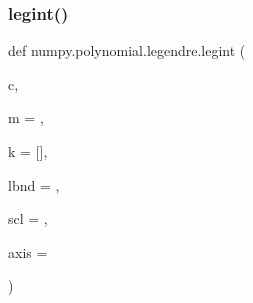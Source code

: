 \subsubsection{\texorpdfstring{legint()}{legint()}}
{\footnotesize\ttfamily def numpy.\+polynomial.\+legendre.\+legint (\begin{DoxyParamCaption}\item[{}]{c,  }\item[{}]{m = {},  }\item[{}]{k = {\ttfamily \mbox{[}\mbox{]}},  }\item[{}]{lbnd = {},  }\item[{}]{scl = {},  }\item[{}]{axis = {} }\end{DoxyParamCaption})}

